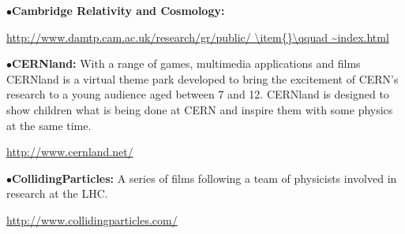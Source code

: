 \medskip





\item{$\bullet$}{\bf Cambridge Relativity and Cosmology:} 
	\item{}\qquad\url{http://www.damtp.cam.ac.uk/research/gr/public/
        \item{}\qquad ~index.html}

\medskip


\item{$\bullet$}{\bf CERNland:}
With a range of games, multimedia applications and films CERNland is a virtual theme park developed to bring the excitement of CERN's research to a young audience aged between 7 and 12. CERNland is designed to show children what is being done at CERN and inspire them with some physics at the same time.
	\item{}\qquad\url{http://www.cernland.net/}

\medskip

\item{$\bullet$}{\bf CollidingParticles:}
A series of films following a team of physicists involved in research at the LHC.
	\item{}\qquad\url{http://www.collidingparticles.com/}
\medskip

